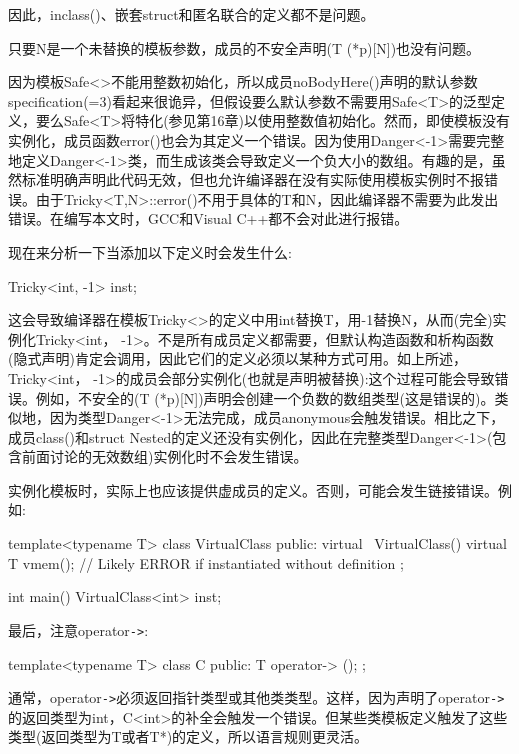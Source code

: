 因此，inclass()、嵌套struct和匿名联合的定义都不是问题。

只要N是一个未替换的模板参数，成员的不安全声明(T (*p)[N])也没有问题。

因为模板Safe<>不能用整数初始化，所以成员noBodyHere()声明的默认参数specification(=3)看起来很诡异，但假设要么默认参数不需要用Safe<T>的泛型定义，要么Safe<T>将特化(参见第16章)以使用整数值初始化。然而，即使模板没有实例化，成员函数error()也会为其定义一个错误。因为使用Danger<-1>需要完整地定义Danger<-1>类，而生成该类会导致定义一个负大小的数组。有趣的是，虽然标准明确声明此代码无效，但也允许编译器在没有实际使用模板实例时不报错误。由于Tricky<T,N>::error()不用于具体的T和N，因此编译器不需要为此发出错误。在编写本文时，GCC和Visual C++都不会对此进行报错。

现在来分析一下当添加以下定义时会发生什么:

\begin{cpp}
Tricky<int, -1> inst;
\end{cpp}

这会导致编译器在模板Tricky<>的定义中用int替换T，用-1替换N，从而(完全)实例化Tricky<int， -1>。不是所有成员定义都需要，但默认构造函数和析构函数(隐式声明)肯定会调用，因此它们的定义必须以某种方式可用。如上所述，Tricky<int， -1>的成员会部分实例化(也就是声明被替换):这个过程可能会导致错误。例如，不安全的(T (*p)[N])声明会创建一个负数的数组类型(这是错误的)。类似地，因为类型Danger<-1>无法完成，成员anonymous会触发错误。相比之下，成员class()和struct Nested的定义还没有实例化，因此在完整类型Danger<-1>(包含前面讨论的无效数组)实例化时不会发生错误。

实例化模板时，实际上也应该提供虚成员的定义。否则，可能会发生链接错误。例如:

\begin{cpp}
template<typename T>
class VirtualClass {
	public:
	virtual ~VirtualClass() {}
	virtual T vmem(); // Likely ERROR if instantiated without definition
};

int main()
{
	VirtualClass<int> inst;
}
\end{cpp}

最后，注意operator\texttt{->}:

\begin{cpp}
template<typename T>
class C {
	public:
	T operator-> ();
};
\end{cpp}

通常，operator\texttt{->}必须返回指针类型或其他类类型。这样，因为声明了operator\texttt{->}的返回类型为int，C<int>的补全会触发一个错误。但某些类模板定义触发了这些类型(返回类型为T或者T*)的定义，所以语言规则更灵活。

